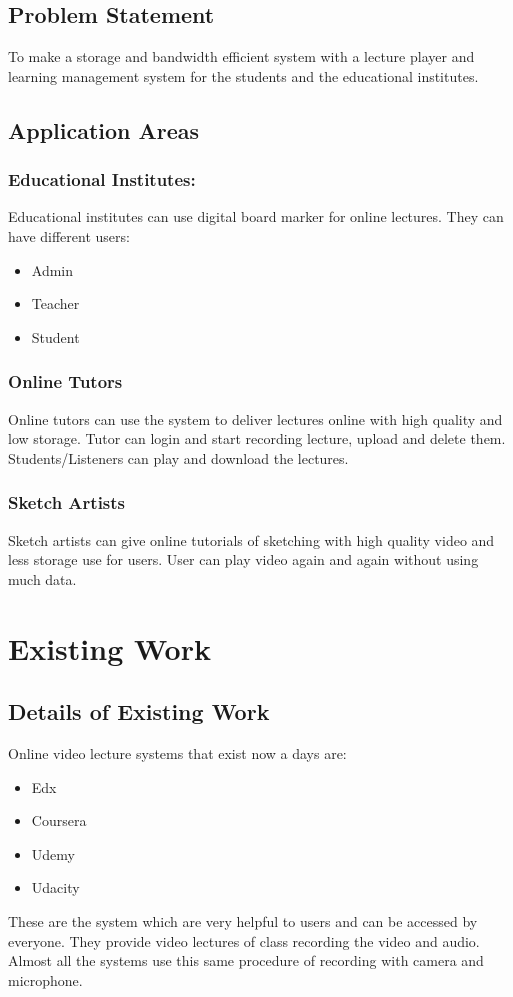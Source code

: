 \documentclass[12pt]{article}
\begin{document}
\subsection{Problem Statement}
To make a storage and bandwidth efficient system with a lecture player and learning management system for the students and the educational institutes.

\subsection{Application Areas}
\subsubsection{Educational Institutes:}
Educational institutes can use digital board marker for online lectures. They can have different users:
\begin{itemize}
\item Admin
\item Teacher
\item Student
\end{itemize}
\subsubsection{Online Tutors}
Online tutors can use the system to deliver lectures online with high quality and low storage. Tutor can login and start recording lecture, upload and delete them. Students/Listeners can play and download the lectures.
\subsubsection{Sketch Artists}
Sketch artists can give online tutorials of sketching with high quality video and less storage use for users. User can play video again and again without using much data.



\section{Existing Work}

\subsection{Details of Existing Work}
Online video lecture systems that exist now a days are:\\
\begin{itemize}
\item Edx
\item Coursera
\item Udemy
\item Udacity
\end{itemize}
These are the system which are very helpful to users and can be accessed by everyone. They provide video lectures of class recording the video and audio. Almost all the systems
use this same procedure of recording with camera and microphone.
\end{document}
